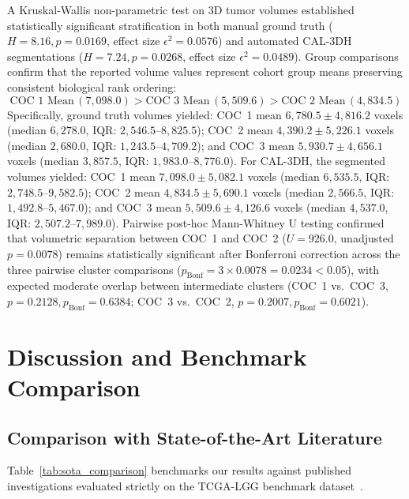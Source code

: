 \documentclass[preprint,12pt,authoryear]{elsarticle}
\begin{document}
A Kruskal-Wallis non-parametric test on 3D tumor volumes established statistically significant stratification in both manual ground truth ($H = 8.16, p = \mathbf{0.0169}$, effect size $\epsilon^2 = 0.0576$) and automated CAL-3DH segmentations ($H = 7.24, p = \mathbf{0.0268}$, effect size $\epsilon^2 = 0.0489$). Group comparisons confirm that the reported volume values represent cohort group means preserving consistent biological rank ordering:
\begin{equation}
\text{COC 1 Mean}\,(7{,}098.0) > \text{COC 3 Mean}\,(5{,}509.6) > \text{COC 2 Mean}\,(4{,}834.5)
\end{equation}
Specifically, ground truth volumes yielded: COC~1 mean $6{,}780.5 \pm 4{,}816.2$ voxels (median $6{,}278.0$, IQR: $2{,}546.5$--$8{,}825.5$); COC~2 mean $4{,}390.2 \pm 5{,}226.1$ voxels (median $2{,}680.0$, IQR: $1{,}243.5$--$4{,}709.2$); and COC~3 mean $5{,}930.7 \pm 4{,}656.1$ voxels (median $3{,}857.5$, IQR: $1{,}983.0$--$8{,}776.0$). For CAL-3DH, the segmented volumes yielded: COC~1 mean $7{,}098.0 \pm 5{,}082.1$ voxels (median $6{,}535.5$, IQR: $2{,}748.5$--$9{,}582.5$); COC~2 mean $4{,}834.5 \pm 5{,}690.1$ voxels (median $2{,}566.5$, IQR: $1{,}492.8$--$5{,}467.0$); and COC~3 mean $5{,}509.6 \pm 4{,}126.6$ voxels (median $4{,}537.0$, IQR: $2{,}507.2$--$7{,}989.0$). Pairwise post-hoc Mann-Whitney U testing confirmed that volumetric separation between COC~1 and COC~2 ($U = 926.0$, unadjusted $p = 0.0078$) remains statistically significant after Bonferroni correction across the three pairwise cluster comparisons ($p_{\text{Bonf}} = 3 \times 0.0078 = 0.0234 < 0.05$), with expected moderate overlap between intermediate clusters (COC~1 vs.\ COC~3, $p = 0.2128, p_{\text{Bonf}} = 0.6384$; COC~3 vs.\ COC~2, $p = 0.2007, p_{\text{Bonf}} = 0.6021$).

\section{Discussion and Benchmark Comparison}
\label{sec:discussion}

\subsection{Comparison with State-of-the-Art Literature}
Table~\ref{tab:sota_comparison} benchmarks our results against published investigations evaluated strictly on the TCGA-LGG benchmark dataset~\citep{buda2019association}.
\end{document}
